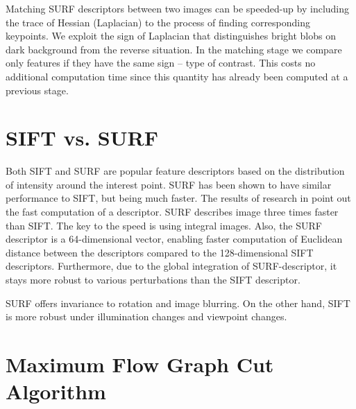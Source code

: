 Matching SURF descriptors between two images can be speeded-up by including the trace of Hessian (Laplacian) to the process of finding corresponding keypoints.
We exploit the sign of Laplacian that distinguishes bright blobs on dark background from the reverse situation.
In the matching stage we compare only features if they have the same sign -- type of contrast. 
This costs no additional computation time since this quantity has already been computed at a previous stage.

\section{SIFT vs. SURF}
Both SIFT and SURF are popular feature descriptors based on the distribution of intensity around the interest point.
SURF has been shown to have similar performance to SIFT, but being much faster. 
The results of research in \cite{surf2006} point out the fast computation of a descriptor.
SURF describes image three times faster than SIFT. 
The key to the speed is using integral images. 
Also, the SURF descriptor is a 64-dimensional vector, enabling faster computation of Euclidean distance between the descriptors compared to the 128-dimensional SIFT descriptors. %
Furthermore, due to the global integration of SURF-descriptor, it stays more robust to various perturbations than the SIFT descriptor. 

SURF offers invariance to rotation and image blurring.
On the other hand, SIFT is more robust under illumination changes and viewpoint changes. 

\section{Maximum Flow Graph Cut Algorithm}

